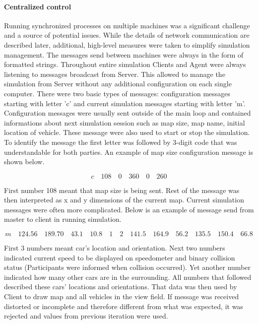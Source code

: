 \documentclass[11pt,english]{article}
\begin{document}
\paragraph{Centralized control}


Running synchronized processes on multiple machines was a significant challenge and a source of potential issues. While the details of network communication are described later, additional, high-level measures were taken to simplify simulation management. The messages send between machines were always in the form of formatted strings. Throughout entire simulation Clients and Agent were always listening to messages broadcast from Server. This allowed to manage the simulation from Server without any additional configuration on each single computer. There were two basic types of messages: configuration messages starting with letter 'c' and current simulation messages starting with letter 'm'.
Configuration messages were usually sent outside of the main loop and contained informations about next simulation session such as map size, map name, initial location of vehicle. These message were also used to start or stop the simulation. To identify the message the first letter was followed by 3-digit code that was understandable for both parties. An example of map size configuration message is shown below.

\begin{equation}
c \quad 108 \quad 0 \quad 360 \quad 0 \quad 260
\end{equation}

First number 108 meant that map size is being sent. Rest of the message was then interpreted as x and y dimensions of the current map.
Current simulation messages were often more complicated. Below is an example of message send from master to client in running simulation. 
 
\begin{equation}
m \quad 124.56 \quad 189.70 \quad 43.1 \quad 10.8 \quad 1 \quad 2 \quad 141.5 \quad 164.9  \quad 56.2 \quad 135.5 \quad 150.4  \quad 66.8
\end{equation}

First 3 numbers meant car's location and orientation. Next two numbers indicated current speed to be displayed on speedometer and binary collision status (Participants were informed when collision occurred). Yet another number indicated how many other cars are in the surrounding. All numbers that followed described these cars' locations and orientations. That data was then used by Client to draw map and all vehicles in the view field. If message was received distorted or incomplete and therefore different from what was expected, it was rejected and values from previous iteration were used.
\end{document}
